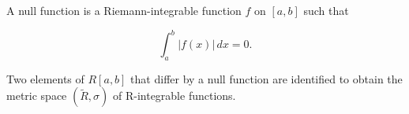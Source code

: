 A null function is a Riemann-integrable function $f$ on $[a,b]$ such that

$$\int_a^b |f(x)| \, dx = 0.$$

Two elements of $R[a,b]$ that differ by a null function are identified to obtain the metric space $(\tilde{R}, \sigma)$ of R-integrable functions.
